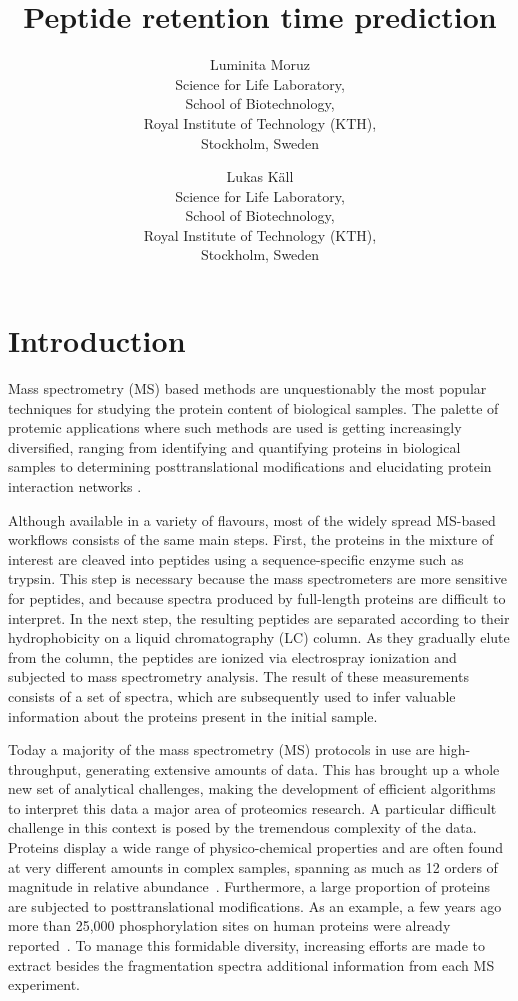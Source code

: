 \documentclass[a4paper]{article}
\title{Peptide retention time prediction}
\author{
Luminita Moruz\\
Science for Life Laboratory,\\
School of Biotechnology,\\
Royal Institute of Technology (KTH),\\
Stockholm, Sweden
\and
Lukas K\"all\\
Science for Life Laboratory,\\
School of Biotechnology,\\
Royal Institute of Technology (KTH),\\
Stockholm, Sweden}
\begin{document}
\maketitle

\setcounter{secnumdepth}{2} %
\setcounter{tocdepth}{2}    %
\tableofcontents            %

\setlength{\parskip}{0.15cm}

\section{Introduction}

Mass spectrometry (MS) based methods are unquestionably the most popular
techniques for studying the protein content of biological samples.
The palette of protemic applications where such methods are used is
getting increasingly diversified, ranging from identifying and
quantifying proteins in biological samples \cite{Geiger2012} to
determining posttranslational modifications \cite{Huttlin2010} and
elucidating protein interaction networks \cite{Gavin2011}. 


Although available in a variety of flavours, most of the widely spread
MS-based workflows consists of the same main steps. First, the
proteins in the mixture of interest are cleaved into peptides using a
sequence-specific enzyme such as trypsin. This step is necessary
because the mass spectrometers are more sensitive for peptides, and
because spectra produced by full-length proteins are difficult to
interpret. In the next step, the resulting peptides are separated
according to their hydrophobicity on a liquid chromatography (LC)
column. As they gradually elute from the column, the peptides are
ionized via electrospray ionization and subjected to mass spectrometry
analysis. The result of these measurements consists of a set of
spectra, which are subsequently used to infer valuable information
about the proteins present in the initial sample.


Today a majority of the mass spectrometry (MS) protocols in use are
high-throughput, generating extensive amounts of data. This has
brought up a whole new set of analytical challenges, making the
development of efficient algorithms to interpret this data a major
area of proteomics research. A particular difficult challenge in this
context is posed by the tremendous complexity of the data. Proteins
display a wide range of physico-chemical properties and are often
found at very different amounts in complex samples, spanning as much
as 12 orders of magnitude in relative abundance~\cite{Angel2012}.
Furthermore, a large proportion of proteins are subjected to
posttranslational modifications. As an example, a few years ago more
than 25,000 phosphorylation sites on human proteins were already
reported~\cite{Lemeer2009}. To manage this formidable diversity,
increasing efforts are made to extract besides the fragmentation
spectra additional information from each MS experiment.
\end{document}
